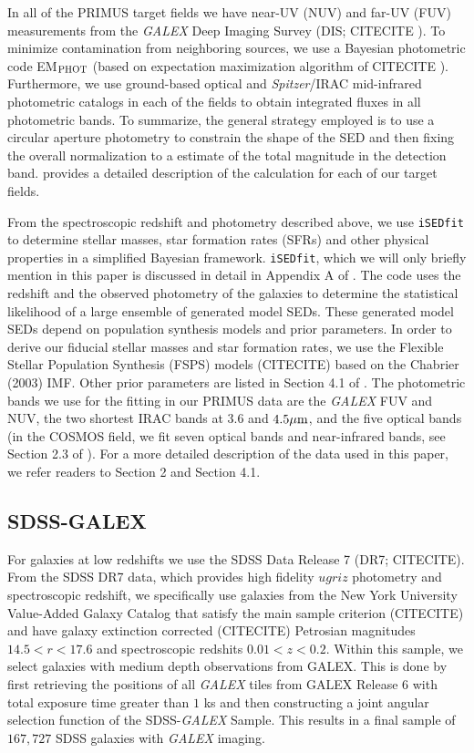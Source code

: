 \documentclass{emulateapj}
\begin{document}
In all of the PRIMUS target fields we have near-UV (NUV) and far-UV (FUV) measurements from the {\em GALEX} Deep Imaging Survey (DIS; CITECITE ). 
To minimize contamination from neighboring sources, we use a Bayesian photometric code EM$_{\rm{PHOT}}$ (based on expectation maximization algorithm of CITECITE ). 
Furthermore, we use ground-based optical and {\em Spitzer}/IRAC mid-infrared photometric catalogs in each of the fields to obtain integrated fluxes in all 
photometric bands.
To summarize, the general strategy employed is to use a circular aperture photometry to constrain the shape of the SED and then fixing the overall normalization to 
a estimate of the total magnitude in the detection band. 
\cite{Moustakas:2013aa} provides a detailed description of the calculation for each of our target fields.  

From the spectroscopic redshift and photometry described above, we use \texttt{iSEDfit} to determine stellar masses, star formation rates (SFRs) and other physical properties
in a simplified Bayesian framework.
\texttt{iSEDfit}, which we will only briefly mention in this paper is discussed in detail in Appendix A of \cite{Moustakas:2013aa}.
The code uses the redshift and the observed photometry of the galaxies to determine the statistical likelihood of a large ensemble of generated model SEDs. 
These generated model SEDs depend on population synthesis models and prior parameters.
In order to derive our fiducial stellar masses and star formation rates, we use the Flexible Stellar Population Synthesis (FSPS) models (CITECITE) based on the Chabrier (2003) IMF. 
Other prior parameters are listed in Section 4.1 of \cite{Moustakas}. 
The photometric bands we use for the fitting in our PRIMUS data are the {\em GALEX} FUV and NUV, the two shortest IRAC bands at $3.6$ and $4.5 \mu \rm{m}$, and the five optical bands
(in the COSMOS field, we fit seven optical bands and near-infrared bands, see Section 2.3 of \cite{Moustakas:2013aa}).
For a more detailed description of the data used in this paper, we refer readers to \cite{Moustakas:2013aa} Section 2 and Section 4.1.

\subsection{SDSS-GALEX} \label{sec:sdss}
For galaxies at low redshifts we use the SDSS Data Release 7 (DR7; CITECITE). 
From the SDSS DR7 data, which provides high fidelity $ugriz$ photometry and spectroscopic redshift, we specifically use galaxies from the New York University 
Value-Added Galaxy Catalog that satisfy the main sample criterion (CITECITE) and have galaxy extinction corrected (CITECITE) Petrosian magnitudes $14.5 < r < 17.6$ 
and spectroscopic redshits $0.01<z<0.2$. 
Within this sample, we select galaxies with medium depth observations from GALEX. 
This is done by first retrieving the positions of all {\em GALEX} tiles from GALEX Release 6 with total exposure time greater than $1$ ks and then constructing 
a joint angular selection function of the SDSS-{\em GALEX} Sample. 
This results in a final sample of $167,727$ SDSS galaxies with {\em GALEX} imaging. 
\end{document}
